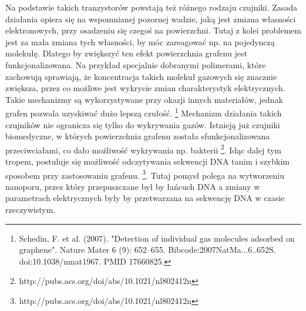 	Na podstawie takich tranzystorów powstają też różnego rodzaju czujniki. Zasada działania opiera się na wspomnianej
	pozornej wadzie, jaką jest zmiana własności elektronowych, przy osadzeniu się czegoś na powierzchni.
	Tutaj z kolei problemem jest za mała zmiana tych własności, by móc zareagować np. na pojedynczą molekułę. Dlatego
	by zwiększyć ten efekt powierzchnia grafenu jest funkcjonalizowana. Na przykład specjalnie dobranymi polimerami,
	które zachowują sprawiają, że koncentracja takich molekuł gazowych się znacznie zwiększa, przez co możliwe jest 
	wykrycie zmian charakterystyk elektrycznych.
	Takie mechanizmy są wykorzystywane przy okazji innych materiałów, jednak grafen pozwala uzyskiwać dużo lepszą 
	czułość. \footnote{Schedin, F. et al. (2007). "Detection of individual gas molecules adsorbed on graphene". Nature Mater 6 (9): 652–655. Bibcode:2007NatMa...6..652S. doi:10.1038/nmat1967. PMID 17660825.}
	Mechanizm działania takich czujników nie ogranicza się tylko do wykrywania gazów. Istnieją już czujniki biomedyczne,
	w których powierzchnia grafenu została sfunkcjonalizowana przeciwciałami, co dało możliwość wykrywania np. bakterii
	\footnote{http://pubs.acs.org/doi/abs/10.1021/nl802412n}.
	Idąc dalej tym tropem, postuluje się możliwość odczytywania sekwencji DNA tanim i szybkim sposobem przy zastosowaniu
	grafenu. \footnote{http://pubs.acs.org/doi/abs/10.1021/nl802412n}. Tutaj pomysł polega na wytworzeniu nanoporu, 
	przez który przepuszczane był by łańcuch DNA a zmiany w parametrach elektrycznych były by przetwarzana na 
	sekwencję DNA w czasie rzeczywistym.

	



